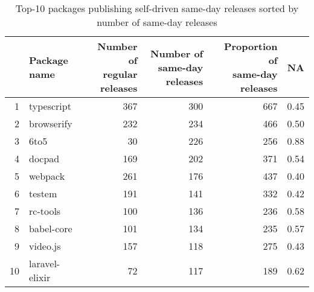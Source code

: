 \begin{table}[ht]
\centering
\begin{tabular}{rlrrrr}
  \hline
 & \pbox{20cm}{Package \\name} & \pbox{20cm}{Number of \\regular releases} & \pbox{20cm}{Number of \\same-day releases} & \pbox{20cm}{Proportion of \\same-day releases} & NA \\ 
  \hline
1 & typescript & 367 & 300 & 667 & 0.45 \\ 
  2 & browserify & 232 & 234 & 466 & 0.50 \\ 
  3 & 6to5 &  30 & 226 & 256 & 0.88 \\ 
  4 & docpad & 169 & 202 & 371 & 0.54 \\ 
  5 & webpack & 261 & 176 & 437 & 0.40 \\ 
  6 & testem & 191 & 141 & 332 & 0.42 \\ 
  7 & rc-tools & 100 & 136 & 236 & 0.58 \\ 
  8 & babel-core & 101 & 134 & 235 & 0.57 \\ 
  9 & video.js & 157 & 118 & 275 & 0.43 \\ 
  10 & laravel-elixir &  72 & 117 & 189 & 0.62 \\ 
   \hline
\end{tabular}
\caption{Top-10 packages publishing self-driven same-day releases sorted by number of same-day releases} 
\end{table}
